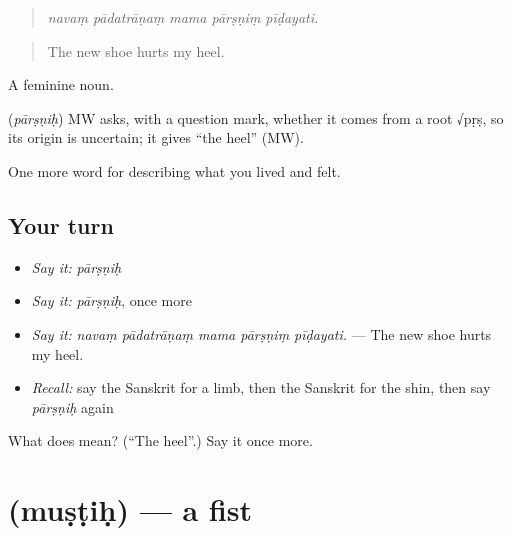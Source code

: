 \begin{quote}
    
\end{quote}

\begin{quote}
\emph{navaṃ pādatrāṇaṃ mama pārṣṇiṃ pīḍayati.}
\end{quote}

\begin{quote}
The new shoe hurts my heel.
\end{quote}

A feminine noun.

\begin{cousinweb}
\textbf{} (\emph{pārṣṇiḥ}) MW asks, with a question mark, whether it comes from a root √pṛṣ, so its origin is uncertain; it gives \textquotedblleft{}the heel\textquotedblright{} (MW).
\end{cousinweb}

\begin{grammarlens}[title={What you've built}]
One more word for describing what you lived and felt.
\end{grammarlens}

\subsection*{Your turn}
\begin{itemize}
\raggedright
  \item \emph{Say it:} \emph{pārṣṇiḥ}
  \item \emph{Say it:} \emph{pārṣṇiḥ}, once more
  \item \emph{Say it:} \emph{navaṃ pādatrāṇaṃ mama pārṣṇiṃ pīḍayati.} — The new shoe hurts my heel.
  \item \emph{Recall:} say the Sanskrit for a limb, then the Sanskrit for the shin, then say \emph{pārṣṇiḥ} again
\end{itemize}

\begin{tcolorbox}[breakable,colback=teal!4,colframe=teal!35!black,title={Before you move on}]
What does  mean? (\textquotedblleft{}The heel\textquotedblright{}.) Say it once more.
\end{tcolorbox}
\section[\texorpdfstring{\sk{मुष्टिः} (muṣṭiḥ)}{मुष्टिः (muṣṭiḥ)}]{ (muṣṭiḥ) — a fist}

